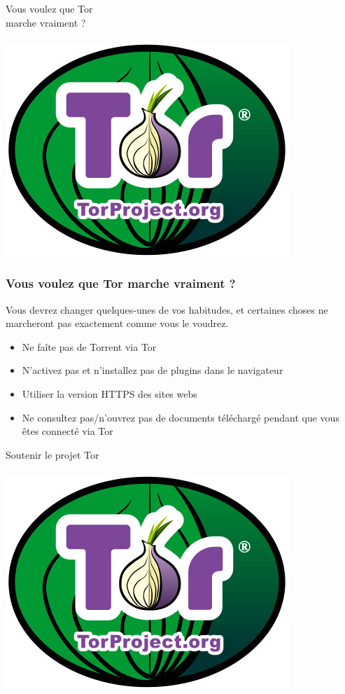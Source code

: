 \documentclass{beamer}
\begin{document}
\begin{frame}
\begin{center}
\Huge{Vous voulez que Tor \\ marche vraiment ?}
\\~\\ \includegraphics[scale=0.4]{./images/logo_tor.jpg}
\end{center}
\end{frame}
\begin{frame}
\frametitle{Vous voulez que Tor marche vraiment ?}
Vous devrez changer quelques-unes de vos habitudes, et certaines choses ne marcheront pas exactement comme vous le voudrez.
\begin{itemize}
\item Ne faîte pas de Torrent via Tor
\item N'activez pas et n'installez pas de plugins dans le navigateur
\item Utiliser la version HTTPS des sites webs
\item Ne consultez pas/n'ouvrez pas de documents téléchargé pendant que vous êtes connecté via Tor
\end{itemize}
\end{frame}
\begin{frame}
\begin{center}
\Huge{Soutenir le projet Tor}
\\~\\ \includegraphics[scale=0.4]{./images/logo_tor.jpg}
\end{center}
\end{frame}
\end{document}
